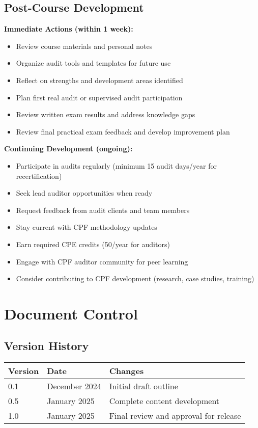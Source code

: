 \documentclass[11pt,a4paper]{article}
\begin{document}
\subsection{Post-Course Development}

\textbf{Immediate Actions (within 1 week):}
\begin{itemize}
\item Review course materials and personal notes
\item Organize audit tools and templates for future use
\item Reflect on strengths and development areas identified
\item Plan first real audit or supervised audit participation
\item Review written exam results and address knowledge gaps
\item Review final practical exam feedback and develop improvement plan
\end{itemize}

\textbf{Continuing Development (ongoing):}
\begin{itemize}
\item Participate in audits regularly (minimum 15 audit days/year for recertification)
\item Seek lead auditor opportunities when ready
\item Request feedback from audit clients and team members
\item Stay current with CPF methodology updates
\item Earn required CPE credits (50/year for auditors)
\item Engage with CPF auditor community for peer learning
\item Consider contributing to CPF development (research, case studies, training)
\end{itemize}

\section{Document Control}

\subsection{Version History}

\begin{tabular}{llp{8cm}}
\toprule
\textbf{Version} & \textbf{Date} & \textbf{Changes} \\
\midrule
0.1 & December 2024 & Initial draft outline \\
0.5 & January 2025 & Complete content development \\
1.0 & January 2025 & Final review and approval for release \\
\bottomrule
\end{tabular}
\end{document}
